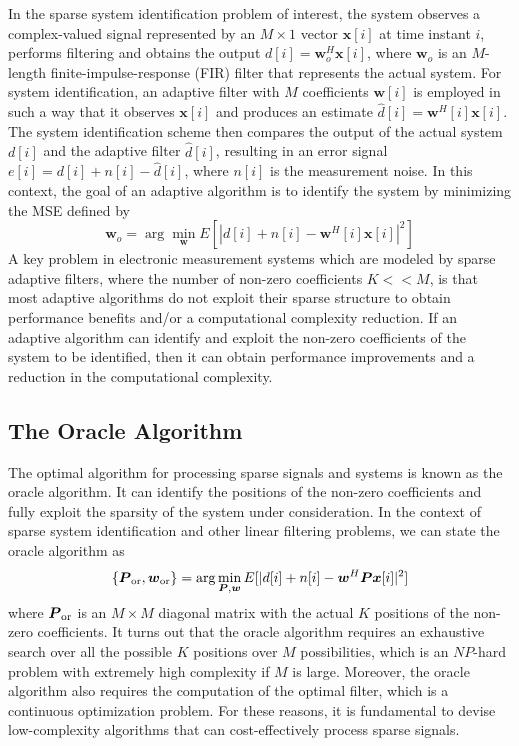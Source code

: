 \documentclass[10pt,onecolumn]{IEEEtran}
\begin{document}
In the sparse system identification problem of interest, the system observes a complex-valued signal represented by an $M
\times 1$ vector ${\boldsymbol x}[i]$ at time instant $i$, performs
filtering and obtains the output $d[i] = {\boldsymbol
w}^H_o{\boldsymbol x}[i]$, where ${\boldsymbol w}_o$ is an
$M$-length finite-impulse-response (FIR) filter that represents the
actual system. For system identification, an adaptive filter with
$M$ coefficients ${\boldsymbol w}[i]$ is employed in such a way that
it observes ${\boldsymbol x}[i]$ and produces an estimate
$\hat{d}[i] = {\boldsymbol w}^H[i]{\boldsymbol x}[i]$. The system
identification scheme then compares the output of the actual system
$d[i]$ and the adaptive filter $\hat{d}[i]$, resulting in an error
signal $e[i] = d[i] + n[i] - \hat{d}[i]$, where $n[i]$ is the
measurement noise. In this context, the goal of an adaptive
algorithm is to identify the system by minimizing the MSE defined by
\begin{equation}
{\boldsymbol w}_o = \arg \min_{\boldsymbol w} E[|d[i] + n[i] -
{\boldsymbol w}^H[i] {\boldsymbol x}[i]|^2]
\end{equation}
A key problem in electronic measurement systems which are modeled by
sparse adaptive filters, where the number of non-zero coefficients
$K << M$, is that most adaptive algorithms do not exploit their
sparse structure to obtain performance benefits and/or a
computational complexity reduction. If an adaptive algorithm can
identify and exploit the non-zero coefficients of the system to be
identified, then it can obtain performance improvements and a
reduction in the computational complexity.

\subsection{The Oracle Algorithm}

The optimal algorithm for processing sparse signals and systems is
known as the oracle algorithm. It can identify the positions of the
non-zero coefficients and fully exploit the sparsity of the system
under consideration. In the context of sparse system identification
and other linear filtering problems, we can state the oracle
algorithm as
\begin{equation}
\{ {\boldsymbol P}_{\rm or}, {\boldsymbol w}_{\rm or} \} = \arg
\min_{{\boldsymbol P}, {\boldsymbol w}} E[|d[i] + n[i] -
{\boldsymbol w}^H{\boldsymbol P}{\boldsymbol x}[i] |^2]
\end{equation}
where ${\boldsymbol P}_{\rm or}$  is an $M \times M$ diagonal
matrix with the actual $K$ positions of the non-zero coefficients.
It turns out that the oracle algorithm requires an exhaustive search
over all the possible $K$ positions over $M$ possibilities, which is
an $NP$-hard problem with extremely high complexity if $M$ is large.
Moreover, the oracle algorithm also requires the computation of the
optimal filter, which is a continuous optimization problem. For
these reasons, it is fundamental to devise low-complexity algorithms
that can cost-effectively process sparse signals.
\end{document}
